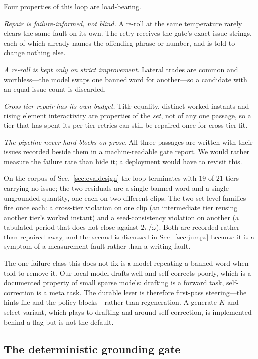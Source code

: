 \documentclass[conference]{IEEEtran}
\begin{document}
Four properties of this loop are load-bearing.

\emph{Repair is failure-informed, not blind.} A re-roll at the same temperature
rarely clears the same fault on its own. The retry receives the gate's exact
issue strings, each of which already names the offending phrase or number, and
is told to change nothing else.

\emph{A re-roll is kept only on strict improvement.} Lateral trades are common
and worthless---the model swaps one banned word for another---so a candidate
with an equal issue count is discarded.

\emph{Cross-tier repair has its own budget.} Title equality, distinct worked
instants and rising element interactivity are properties of the \emph{set}, not
of any one passage, so a tier that has spent its per-tier retries can still be
repaired once for cross-tier fit.

\emph{The pipeline never hard-blocks on prose.} All three passages are written
with their issues recorded beside them in a machine-readable gate report. We
would rather measure the failure rate than hide it; a deployment would have to
revisit this.

On the corpus of Sec.~\ref{sec:evaldesign} the loop terminates with $19$ of
$21$ tiers carrying no issue; the two residuals are a single banned word and a
single ungrounded quantity, one each on two different clips. The two
set-level families fire once each: a cross-tier violation on one clip (an
intermediate tier reusing another tier's worked instant) and a
seed-consistency violation on another (a tabulated period that does not close
against $2\pi/\omega$). Both are recorded rather than repaired away, and the
second is discussed in Sec.~\ref{sec:jumps} because it is a symptom of a
measurement fault rather than a writing fault.

The one failure class this does not fix is a model repeating a banned word when
told to remove it. Our local model drafts well and self-corrects poorly, which
is a documented property of small sparse models: drafting is a forward task,
self-correction is a meta task. The durable lever is therefore first-pass
steering---the hints file and the policy blocks---rather than regeneration. A
generate-$K$-and-select variant, which plays to drafting and around
self-correction, is implemented behind a flag but is not the default.

\subsection{The deterministic grounding gate}
\label{sec:gate}
\end{document}
